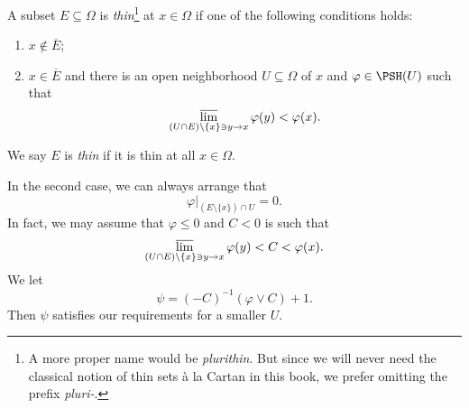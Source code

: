 \begin{definition}\label{def:pshfunctions:L691}
  A subset $E\subseteq \Omega$ is \emph{thin}\footnote{A more proper name would be \emph{plurithin}. But since we will never need the classical notion of thin sets à la Cartan in this book, we prefer omitting the prefix \emph{pluri-}.} at $x\in \Omega$ if one of the following conditions holds:
  \begin{enumerate}
    \item\label{itm:chapter-pshfunctions:L698:1} $x\not\in \overline{E}$;
    \item\label{itm:chapter-pshfunctions:L698:2} $x\in \overline{E}$ and there is an open neighborhood $U\subseteq \Omega$ of $x$ and $\varphi\in \PSH(U)$ such that
    \[
      \varlimsup_{(U\cap E)\setminus\{x\} \ni y\to x} \varphi(y)<\varphi(x).
    \]
  \end{enumerate}
  We say $E$ is \emph{thin} if it is thin at all $x\in \Omega$.
\end{definition}
\begin{remark}\label{rmk:cstthindef}
    In the second case, we can always arrange that
    \[
    \varphi|_{(E\setminus \{x\})\cap U}=0.
    \]
    In fact, we may assume that $\varphi\leq 0$ and $C<0$ is such that
    \[
    \varlimsup_{(U\cap E)\setminus\{x\} \ni y\to x} \varphi(y)<C<\varphi(x).
    \]
    We let
    \[
        \psi=(-C)^{-1}(\varphi\lor C)+1.
    \]
    Then $\psi$ satisfies our requirements for a smaller $U$.
\end{remark}

